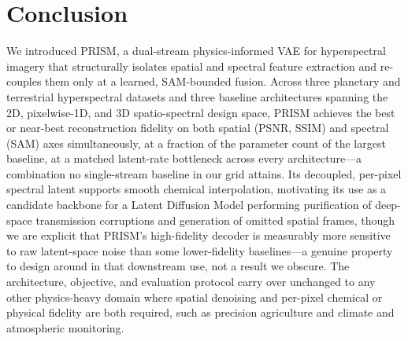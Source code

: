 \documentclass[twoside,11pt]{article}
\begin{document}
\section{Conclusion}
\label{sec:conclusion}

We introduced PRISM, a dual-stream physics-informed VAE for hyperspectral imagery that structurally isolates spatial and spectral feature extraction and re-couples them only at a learned, SAM-bounded fusion. Across three planetary and terrestrial hyperspectral datasets and three baseline architectures spanning the 2D, pixelwise-1D, and 3D spatio-spectral design space, PRISM achieves the best or near-best reconstruction fidelity on both spatial (PSNR, SSIM) and spectral (SAM) axes simultaneously, at a fraction of the parameter count of the largest baseline, at a matched latent-rate bottleneck across every architecture---a combination no single-stream baseline in our grid attains. Its decoupled, per-pixel spectral latent supports smooth chemical interpolation, motivating its use as a candidate backbone for a Latent Diffusion Model performing purification of deep-space transmission corruptions and generation of omitted spatial frames, though we are explicit that PRISM's high-fidelity decoder is measurably more sensitive to raw latent-space noise than some lower-fidelity baselines---a genuine property to design around in that downstream use, not a result we obscure. The architecture, objective, and evaluation protocol carry over unchanged to any other physics-heavy domain where spatial denoising and per-pixel chemical or physical fidelity are both required, such as precision agriculture and climate and atmospheric monitoring.

\acks{%
}


\vskip 0.2in

\end{document}
